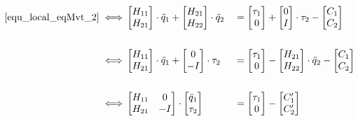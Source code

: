\documentclass{report}
\begin{document}
\begin{alignat}{2}
\eqref{equ_local_eqMvt_2} \iff
&\begin{bmatrix}
  H_{11} \\
  H_{21}
\end{bmatrix} 
\cdot \ddot{q}_1
+
\begin{bmatrix}
  H_{21} \\
  H_{22}
\end{bmatrix}
\cdot \ddot{q}_2
&&=
\begin{bmatrix}
  \tau_1 \\
  0
\end{bmatrix} 
+
\begin{bmatrix}
  0 \\
  I
\end{bmatrix} 
\cdot \tau_2
-
\begin{bmatrix}
  C_{1} \\
  C_{2}
\end{bmatrix} \notag \\
\\ \iff
&\begin{bmatrix}
  H_{11} \\
  H_{21}
\end{bmatrix} 
\cdot \ddot{q}_1
+
\begin{bmatrix}
  0 \\
  -I
\end{bmatrix} 
\cdot \tau_2
&&=
\begin{bmatrix}
  \tau_1 \\
  0
\end{bmatrix} 
-
\begin{bmatrix}
  H_{21} \\
  H_{22}
\end{bmatrix}
\cdot \ddot{q}_2
-
\begin{bmatrix}
  C_{1} \\
  C_{2}
\end{bmatrix} \notag \\
\\ \iff
&\begin{bmatrix}
  H_{11} & 0 \\
  H_{21} &  -I
\end{bmatrix} 
\cdot
\begin{bmatrix}
  \ddot{q}_1 \\
  \tau_2
\end{bmatrix} 
&&=
\begin{bmatrix}
  \tau_1 \\
  0
\end{bmatrix} 
-
\begin{bmatrix}
  C'_{1} \\
  C'_{2}
\end{bmatrix} \label{equ_local_eqMvt_3}
\end{alignat}
\end{document}

